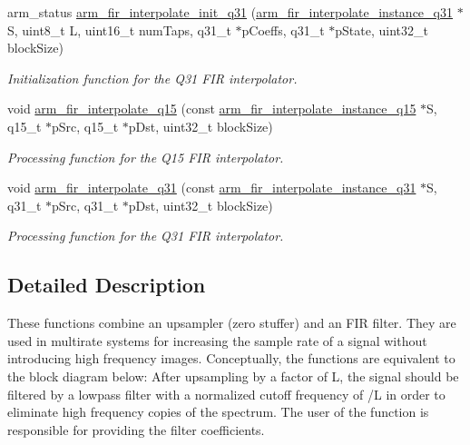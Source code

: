 \begin{DoxyCompactItemize}
arm\-\_\-status \hyperlink{group___f_i_r___interpolate_ga9d0ba38ce9f12a850dd242731d307476}{arm\-\_\-fir\-\_\-interpolate\-\_\-init\-\_\-q31} (\hyperlink{structarm__fir__interpolate__instance__q31}{arm\-\_\-fir\-\_\-interpolate\-\_\-instance\-\_\-q31} $\ast$S, uint8\-\_\-t L, uint16\-\_\-t num\-Taps, q31\-\_\-t $\ast$p\-Coeffs, q31\-\_\-t $\ast$p\-State, uint32\-\_\-t block\-Size)
\begin{DoxyCompactList}\small\item\em Initialization function for the Q31 F\-I\-R interpolator. \end{DoxyCompactList}\item 
void \hyperlink{group___f_i_r___interpolate_ga7962b5f9636e54899f75d0c5936800b5}{arm\-\_\-fir\-\_\-interpolate\-\_\-q15} (const \hyperlink{structarm__fir__interpolate__instance__q15}{arm\-\_\-fir\-\_\-interpolate\-\_\-instance\-\_\-q15} $\ast$S, q15\-\_\-t $\ast$p\-Src, q15\-\_\-t $\ast$p\-Dst, uint32\-\_\-t block\-Size)
\begin{DoxyCompactList}\small\item\em Processing function for the Q15 F\-I\-R interpolator. \end{DoxyCompactList}\item 
void \hyperlink{group___f_i_r___interpolate_gaac9c0f01ed91c53f7083995d7411f5ee}{arm\-\_\-fir\-\_\-interpolate\-\_\-q31} (const \hyperlink{structarm__fir__interpolate__instance__q31}{arm\-\_\-fir\-\_\-interpolate\-\_\-instance\-\_\-q31} $\ast$S, q31\-\_\-t $\ast$p\-Src, q31\-\_\-t $\ast$p\-Dst, uint32\-\_\-t block\-Size)
\begin{DoxyCompactList}\small\item\em Processing function for the Q31 F\-I\-R interpolator. \end{DoxyCompactList}\end{DoxyCompactItemize}


\subsection{Detailed Description}
These functions combine an upsampler (zero stuffer) and an F\-I\-R filter. They are used in multirate systems for increasing the sample rate of a signal without introducing high frequency images. Conceptually, the functions are equivalent to the block diagram below\-:  After upsampling by a factor of {\ttfamily L}, the signal should be filtered by a lowpass filter with a normalized cutoff frequency of {/\-L} in order to eliminate high frequency copies of the spectrum. The user of the function is responsible for providing the filter coefficients.


